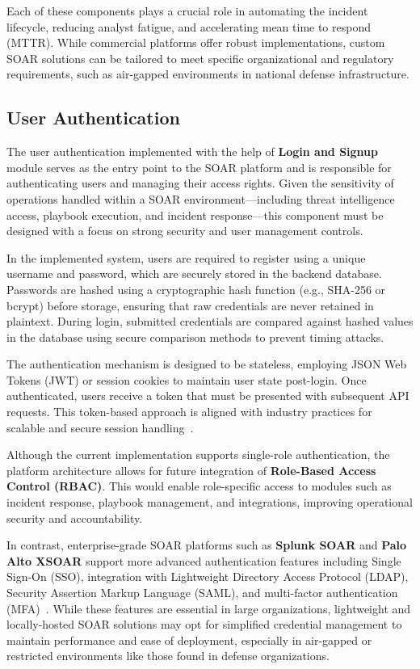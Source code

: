 Each of these components plays a crucial role in automating the incident lifecycle, reducing analyst fatigue, and accelerating mean time to respond (MTTR). While commercial platforms offer robust implementations, custom SOAR solutions can be tailored to meet specific organizational and regulatory requirements, such as air-gapped environments in national defense infrastructure.

\subsection{User Authentication}

The user authentication implemented with the help of \textbf{Login and Signup} module serves as the entry point to the SOAR platform and is responsible for authenticating users and managing their access rights. Given the sensitivity of operations handled within a SOAR environment—including threat intelligence access, playbook execution, and incident response—this component must be designed with a focus on strong security and user management controls.

In the implemented system, users are required to register using a unique username and password, which are securely stored in the backend database. Passwords are hashed using a cryptographic hash function (e.g., SHA-256 or bcrypt) before storage, ensuring that raw credentials are never retained in plaintext. During login, submitted credentials are compared against hashed values in the database using secure comparison methods to prevent timing attacks.

The authentication mechanism is designed to be stateless, employing JSON Web Tokens (JWT) or session cookies to maintain user state post-login. Once authenticated, users receive a token that must be presented with subsequent API requests. This token-based approach is aligned with industry practices for scalable and secure session handling~\cite{paloalto, techtarget}.

Although the current implementation supports single-role authentication, the platform architecture allows for future integration of \textbf{Role-Based Access Control (RBAC)}. This would enable role-specific access to modules such as incident response, playbook management, and integrations, improving operational security and accountability.

In contrast, enterprise-grade SOAR platforms such as \textbf{Splunk SOAR} and \textbf{Palo Alto XSOAR} support more advanced authentication features including Single Sign-On (SSO), integration with Lightweight Directory Access Protocol (LDAP), Security Assertion Markup Language (SAML), and multi-factor authentication (MFA)~\cite{splunk, paloalto}. While these features are essential in large organizations, lightweight and locally-hosted SOAR solutions may opt for simplified credential management to maintain performance and ease of deployment, especially in air-gapped or restricted environments like those found in defense organizations.

